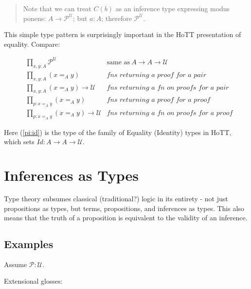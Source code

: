 \documentclass{article}
\begin{document}
\begin{quote}
Note that we can treat \(C(b)\) as an inference type expressing modus
ponens: \(A\to\mathcal{P}^{\mathcal{U}}\); but \(a:A\); therefore \(\mathcal{P}^{\mathcal{U}}\).
\end{quote}

This simple type pattern is surprisingly important in the HoTT
presentation of equality.  Compare:

\begin{align}
  &\prod\limits_{x,y:A}\mathcal{P}^{\mathcal{U}} & \textrm{same as}\ A\to A\to\mathcal{U} \label{pi:id} \\
  &\prod\limits_{x,y:A}(x=_Ay) &\textit{fns returning a proof for a pair} \label{pi:idp} \\
  &\prod\limits_{x,y:A}(x=_Ay)\to\mathcal{U} & \textit{fns returning a fn on proofs for a pair} \label{pi:idppfam} \\
  &\prod\limits_{p:x=_Ay}(x=_Ay) \label{pi:idpp} & \textit{fns returning a proof for a proof} \\
  &\prod\limits_{p:x=_Ay}(x=_Ay)\to\mathcal{U} & \textit{fns returning a fn on proofs for a proof} \label{pi:idfam}
\end{align}

Here (\ref{pi:id}) is the type of the family of Equality (Identity)
types in HoTT, which sets \(Id:A\to A\to\mathcal{U}\).



\section{Inferences as Types}
Type theory subsumes classical (traditional?) logic in its entirety -
not just propositions as types, but terms, propositions, and
inferences as types.  This also means that the truth of a proposition
is equivalent to the validity of an inference.

\subsection{Examples}
Assume \(\mathcal{P:U}\).
\medskip

\noindent Extensional glosses:
\end{document}
